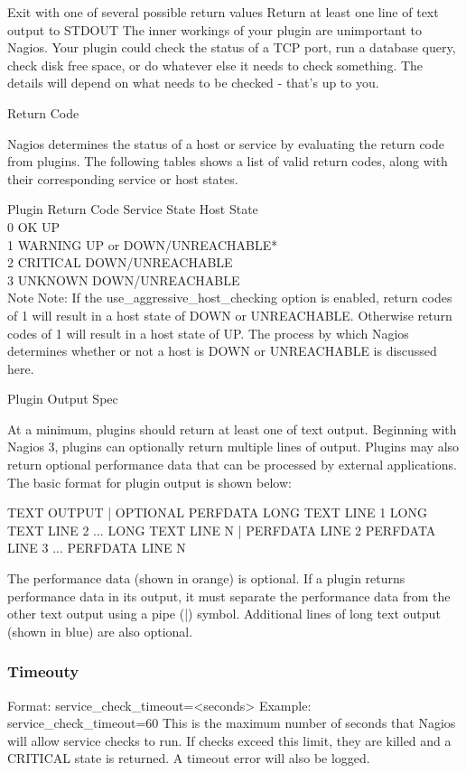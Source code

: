 \documentclass[11pt,final,oneside]{fithesis}
\begin{document}
Exit with one of several possible return values
Return at least one line of text output to STDOUT
The inner workings of your plugin are unimportant to Nagios. Your plugin could check the status of a TCP port, run a database query, check disk free space, or do whatever else it needs to check something. The details will depend on what needs to be checked - that's up to you.

Return Code

Nagios determines the status of a host or service by evaluating the return code from plugins. The following tables shows a list of valid return codes, along with their corresponding service or host states.

Plugin Return Code	Service State	Host State
\\0	OK	UP
\\1	WARNING	UP or DOWN/UNREACHABLE*
\\2	CRITICAL	DOWN/UNREACHABLE
\\3	UNKNOWN	DOWN/UNREACHABLE
\\Note Note: If the use_aggressive_host_checking option is enabled, return codes of 1 will result in a host state of DOWN or UNREACHABLE. Otherwise return codes of 1 will result in a host state of UP. The process by which Nagios determines whether or not a host is DOWN or UNREACHABLE is discussed here.

Plugin Output Spec

At a minimum, plugins should return at least one of text output. Beginning with Nagios 3, plugins can optionally return multiple lines of output. Plugins may also return optional performance data that can be processed by external applications. The basic format for plugin output is shown below:

TEXT OUTPUT | OPTIONAL PERFDATA
LONG TEXT LINE 1
LONG TEXT LINE 2
...
LONG TEXT LINE N | PERFDATA LINE 2
PERFDATA LINE 3
...
PERFDATA LINE N

The performance data (shown in orange) is optional. If a plugin returns performance data in its output, it must separate the performance data from the other text output using a pipe (|) symbol. Additional lines of long text output (shown in blue) are also optional.
\cite{01}

\subsubsection{Timeouty}

Format:	service_check_timeout=<seconds>
Example:	service_check_timeout=60
This is the maximum number of seconds that Nagios will allow service checks to run. If checks exceed this limit, they are killed and a CRITICAL state is returned. A timeout error will also be logged.
\end{document}
